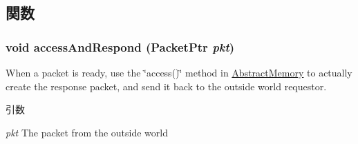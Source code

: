 \subsection{関数}
\hypertarget{classDRAMSim2_a26aa336cb4192aab04418121f361fa49}{
\subsubsection[{accessAndRespond}]{\setlength{\rightskip}{0pt plus 5cm}void accessAndRespond ({\bf PacketPtr} {\em pkt})}}
\label{classDRAMSim2_a26aa336cb4192aab04418121f361fa49}
When a packet is ready, use the \char`\"{}access()\char`\"{} method in \hyperlink{classAbstractMemory}{AbstractMemory} to actually create the response packet, and send it back to the outside world requestor.


\begin{DoxyParams}{引数}
\item[{\em pkt}]The packet from the outside world \end{DoxyParams}



